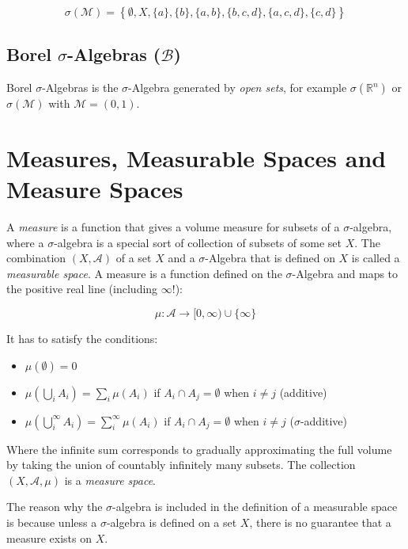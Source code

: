 \begin{equation}
\sigma(\mathscr{M}) = \left\{ \emptyset, X, \{a\}, \{b\}, \{a,b\}, \{b,c,d\}, \{a,c,d\}, \{c,d\} \right\}
\end{equation}


\subsection{Borel $\sigma$-Algebras ($\mathscr{B}$)	}

Borel $\sigma$-Algebras is the $\sigma$-Algebra generated by \textit{open sets}, for example $\sigma(\mathbb{R}^n)$ or $\sigma(\mathscr{M})$ with $\mathscr{M} = (0,1)$.


\section{Measures, Measurable Spaces and Measure Spaces}
A \textit{measure} is a function that gives a volume measure for subsets of a $\sigma$-algebra, where a $\sigma$-algebra is a special sort of collection of subsets of some set $X$. 
The combination $(X,\mathscr{A})$ of a set $X$ and a $\sigma$-Algebra that is defined on $X$ is called a \textit{measurable space}. A measure is a function defined on the $\sigma$-Algebra and maps to the positive real line (including $\infty$!):

\begin{equation}
\mu: \mathscr{A} \rightarrow [0,\infty)\cup\{\infty\} 
\end{equation}

It has to satisfy the conditions:

\begin{itemize}
\item $\mu(\emptyset) = 0$
\item $\mu(\bigcup_i A_i) = \sum_i \mu(A_i)$ if $A_i \cap A_j = \emptyset$ when $i\neq j$ (additive)
\item $\mu(\bigcup^{\infty}_i A_i) = \sum^{\infty}_i \mu(A_i)$ if $A_i \cap A_j = \emptyset$ when $i\neq j$ ($\sigma$-additive) 
\end{itemize}

Where the infinite sum corresponds to gradually approximating the full volume by taking the union of countably infinitely many subsets. The collection $(X,\mathscr{A},\mu)$ is a \textit{measure space}. 

The reason why the $\sigma$-algebra is included in the definition of a measurable space is because unless a $\sigma$-algebra is defined on a set $X$, there is no guarantee that a measure exists on $X$.

